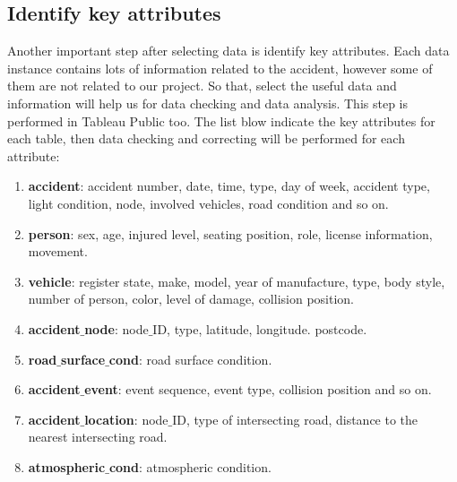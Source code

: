 \documentclass[11pt]{article}
\theoremstyle{definition}
\begin{document}
\subsection{Identify key attributes}
\label{IdentifyKeyAttributes}
Another important step after selecting data is identify key attributes. Each data instance contains lots of information related to the accident, however some of them are not related to our project. So that, select the useful data and information will help us for data checking and data analysis. This step is performed in Tableau Public too. The list blow indicate the key attributes for each table, then data checking and correcting will be performed for each attribute:
\begin{enumerate}
	\item \textbf{accident}: accident number, date, time, type, day of week, accident type, light condition, node, involved vehicles, road condition and so on.
	\item \textbf{person}: sex, age, injured level, seating position, role, license information, movement. 
	\item \textbf{vehicle}: register state, make, model, year of manufacture, type, body style, number of person, color, level of damage, collision position. 
	\item \textbf{accident$\_$node}:	node$\_$ID, type, latitude, longitude. postcode.  
	\item \textbf{road$\_$surface$\_$cond}: road surface condition.
	\item \textbf{accident$\_$event}: event sequence, event type, collision position and so on.
	\item \textbf{accident$\_$location}:	 node$\_$ID, type of intersecting road, distance to the nearest intersecting road. 
	\item \textbf{atmospheric$\_$cond}:	atmospheric condition.
\end{enumerate}
\end{document}
